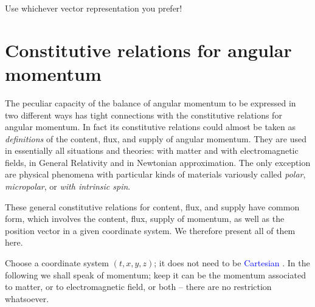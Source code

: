 \documentclass[a4paper,12pt,%
onecolumn,oneside,%
british%
]{memoir}
\renewcommand*{\|}[1][]{\nonscript\:#1\vert\nonscript\:\mathopen{}}
\newcommand*{\sect}{\S}%
\renewcommand*{\autoref}[3][\sect\,\ref]{\textcolor{blue}{#3}
\raisebox{0.6ex}{\color{blue}\miniscule%
\faIcon{angle-right}%
\;#1{#2}\;p.\,\pageref{#2}}}
\begin{document}
Use whichever vector representation you prefer! %


\section{Constitutive relations for angular momentum}
\label{sec:constitutive_angmomentum_standard}

The peculiar capacity of the balance of angular momentum to be expressed in two different ways has tight connections with the constitutive relations for angular momentum. In fact its constitutive relations could almost be taken as \emph{definitions} of the content, flux, and supply of angular momentum. They are used in essentially all situations and theories: with matter and with electromagnetic fields, in General Relativity and in Newtonian approximation. The only exception are physical phenomena with particular kinds of materials variously called \emph{polar}, \emph{micropolar}, or \emph{with intrinsic spin}.

These general constitutive relations for content, flux, and supply have common form, which involves the content, flux, supply of momentum, as well as the position vector in a given coordinate system. We therefore present all of them here.

Choose a coordinate system $(t,x,y,z)$; it does not need to be \autoref{def:cartesian_coords}{Cartesian}. In the following we shall speak of momentum; keep it can be the momentum associated to matter, or to electromagnetic field, or both -- there are no restriction whatsoever.

\medskip
\end{document}
